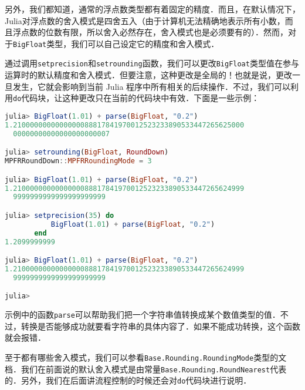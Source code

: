另外，我们都知道，通常的浮点数类型都有着固定的精度．而且，在默认情况下，Julia对浮点数的舍入模式是四舍五入（由于计算机无法精确地表示所有小数，而且浮点数的位数有限，所以舍入必然存在，舍入模式也是必须要有的）．然而，对于\verb|BigFloat|类型，我们可以自己设定它的精度和舍入模式．

通过调用\verb|setprecision|和\verb|setrounding|函数，我们可以更改\verb|BigFloat|类型值在参与运算时的默认精度和舍入模式．但要注意，这种更改是全局的！也就是说，更改一旦发生，它就会影响到当前 Julia 程序中所有相关的后续操作．不过，我们可以利用\verb|do|代码块，让这种更改只在当前的代码块中有效．下面是一些示例：
\begin{lstlisting}[language=julia]
julia> BigFloat(1.01) + parse(BigFloat, "0.2")
1.2100000000000000088817841970012523233890533447265625000
  00000000000000000000007

julia> setrounding(BigFloat, RoundDown)
MPFRRoundDown::MPFRRoundingMode = 3

julia> BigFloat(1.01) + parse(BigFloat, "0.2")
1.2100000000000000088817841970012523233890533447265624999
  9999999999999999999999

julia> setprecision(35) do 
           BigFloat(1.01) + parse(BigFloat, "0.2") 
       end
1.2099999999

julia> BigFloat(1.01) + parse(BigFloat, "0.2") 
1.2100000000000000088817841970012523233890533447265624999
  9999999999999999999999

julia> 
\end{lstlisting}

示例中的函数\verb|parse|可以帮助我们把一个字符串值转换成某个数值类型的值．不过，转换是否能够成功就要看字符串的具体内容了．如果不能成功转换，这个函数就会报错．

至于都有哪些舍入模式，我们可以参看\verb|Base.Rounding.RoundingMode|类型的文档．我们在前面说的默认舍入模式是由常量\verb|Base.Rounding.RoundNearest|代表的．另外，我们在后面讲流程控制的时候还会对\verb|do|代码块进行说明．